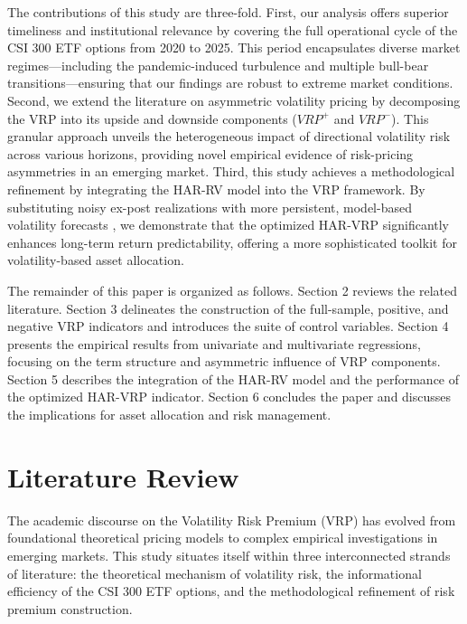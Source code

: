 \documentclass[a4paper, 12pt]{article}    %
\begin{document}
The contributions of this study are three-fold. First, our analysis offers superior timeliness and institutional relevance by covering the full operational cycle of the CSI 300 ETF options from 2020 to 2025. This period encapsulates diverse market regimes—including the pandemic-induced turbulence and multiple bull-bear transitions—ensuring that our findings are robust to extreme market conditions. Second, we extend the literature on asymmetric volatility pricing {\citep{bollerslev2014}} by decomposing the VRP into its upside and downside components ($VRP^+$ and $VRP^-$). This granular approach unveils the heterogeneous impact of directional volatility risk across various horizons, providing novel empirical evidence of risk-pricing asymmetries in an emerging market. Third, this study achieves a methodological refinement by integrating the HAR-RV model into the VRP framework. By substituting noisy ex-post realizations with more persistent, model-based volatility forecasts {\citep{hansen2010realizedgarch}}, we demonstrate that the optimized HAR-VRP significantly enhances long-term return predictability, offering a more sophisticated toolkit for volatility-based asset allocation.

The remainder of this paper is organized as follows. Section 2 reviews the related literature. Section 3 delineates the construction of the full-sample, positive, and negative VRP indicators and introduces the suite of control variables. Section 4 presents the empirical results from univariate and multivariate regressions, focusing on the term structure and asymmetric influence of VRP components. Section 5 describes the integration of the HAR-RV model and the performance of the optimized HAR-VRP indicator. Section 6 concludes the paper and discusses the implications for asset allocation and risk management.

\section{Literature Review}

The academic discourse on the Volatility Risk Premium (VRP) has evolved from foundational theoretical pricing models to complex empirical investigations in emerging markets. This study situates itself within three interconnected strands of literature: the theoretical mechanism of volatility risk, the informational efficiency of the CSI 300 ETF options, and the methodological refinement of risk premium construction.
\end{document}
